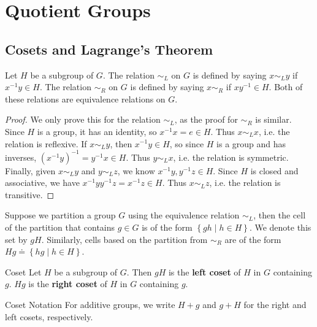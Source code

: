 \documentclass[10pt]{report}
\begin{document}

\chapter{Quotient Groups}


\section{Cosets and Lagrange's Theorem}


\begin{thrm}{}{}
Let $H$ be a subgroup of $G$. The relation $\sim_L$ on $G$ is defined by saying $x \sim_L y$ if $x^{-1}y \in H$. The relation $\sim_R$ on $G$ is defined by saying $x \sim_R$ if $xy^{-1} \in H$. Both of these relations are equivalence relations on $G$.
\end{thrm}
\begin{proof}
	We only prove this for the relation $\sim_L$, as the proof for $\sim_R$ is similar. Since $H$ is a group, it has an identity, so $x^{-1} x = e \in H$. Thus $x \sim_L x$, i.e. the relation is reflexive. If $x \sim_L y$, then $x^{-1}y \in H$, so since $H$ is a group and has inverses, $(x^{-1}y)^{-1}=y^{-1}x\in H$. Thus $y \sim_L x$, i.e. the relation is symmetric. Finally, given $x \sim_L y$ and $y \sim_L z$, we know $x^{-1}y, y^{-1}z \in H$. Since $H$ is closed and associative, we have $x^{-1}yy^{-1}z = x^{-1}z \in H$. Thus $x \sim_L z$, i.e. the relation is transitive.
\end{proof}

Suppose we partition a group $G$ using the equivalence relation $\sim_L$, then the cell of the partition that contains $g \in G$ is of the form $\left\{ gh \;|\; h \in H \right\}$. We denote this set by $gH$. Similarly, cells based on the partition from $\sim_R$ are of the form $Hg \doteq \left\{ hg \;|\; h \in H \right\}$.

\begin{defn}{Coset}{}
Let $H$ be a subgroup of $G$. Then $gH$ is the \textbf{left coset} of $H$ in $G$ containing $g$. $Hg$ is the \textbf{right coset} of $H$ in $G$ containing $g$.
\end{defn}

\begin{note}{Coset Notation}{}
For additive groups, we write $H+g$ and $g+H$ for the right and left cosets, respectively.
\end{note}
\end{document}
